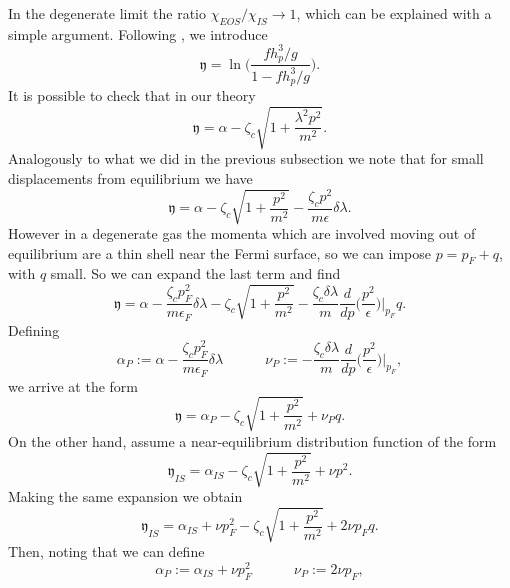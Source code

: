 \documentclass[useAMS,usenatbib,prd,twocolumn,nofootinbib]{revtex4-1}
\newcommand{\spc}{\quad \quad \quad}
\begin{document}
In the degenerate limit the ratio $\chi_{EOS}/\chi_{IS} \longrightarrow 1$, which can be explained with a simple argument. Following \cite{Israel_Stewart_1979}, we introduce
\begin{equation}
\mathfrak{y}= \ln \bigg( \dfrac{f h_p^3/g}{1-f h_p^3/g} \bigg).
\end{equation}  
It is possible to check that in our theory
\begin{equation}
\mathfrak{y}= \alpha - \zeta_c \sqrt{1+ \dfrac{\lambda^2 p^2}{m^2}}.
\end{equation}
Analogously to what we did in the previous subsection we note that for small displacements from equilibrium we have
\begin{equation}
\mathfrak{y}= 
\alpha - \zeta_c \sqrt{1+ \dfrac{p^2}{m^2}} -\dfrac{\zeta_c p^2}{m \epsilon} \delta \lambda. 
\end{equation}
However in a degenerate gas the momenta which are involved moving out of equilibrium are a thin shell near the Fermi surface, so we can impose $p=p_F+q$, with $q$ small. So we can expand the last term and find
\begin{equation}
\mathfrak{y}= \alpha-\dfrac{\zeta_c p_F^2}{m \epsilon_F} \delta \lambda - \zeta_c \sqrt{1+ \dfrac{p^2}{m^2}}-\dfrac{\zeta_c \delta \lambda}{m} \dfrac{d}{dp}\bigg( \dfrac{p^2}{\epsilon} \bigg)\bigg|_{p_F} q .
\end{equation} 
Defining
\begin{equation}
\alpha_P := \alpha-\dfrac{\zeta_c p_F^2}{m \epsilon_F} \delta \lambda \spc \nu_P := -\dfrac{\zeta_c \delta \lambda}{m} \dfrac{d}{dp}\bigg( \dfrac{p^2}{\epsilon} \bigg)\bigg|_{p_F},
\end{equation}
we arrive at the form
\begin{equation}\label{concordinaoproprio}
\mathfrak{y}= \alpha_P - \zeta_c \sqrt{1+ \dfrac{p^2}{m^2}} + \nu_P q .
\end{equation}
On the other hand, \cite{Israel_Stewart_1979} assume a near-equilibrium distribution function of the form
\begin{equation}
\mathfrak{y}_{IS}= \alpha_{IS} -\zeta_c \sqrt{1+ \dfrac{p^2}{m^2}} + \nu p^2.
\end{equation}
Making the same expansion we obtain
\begin{equation}
\mathfrak{y}_{IS}= \alpha_{IS}+\nu p_F^2 -\zeta_c \sqrt{1+ \dfrac{p^2}{m^2}} + 2\nu p_F q.
\end{equation}
Then, noting that we can define
\begin{equation}
\alpha_P := \alpha_{IS}+\nu p_F^2  \spc \nu_P :=2\nu p_F,
\end{equation}
\end{document}
